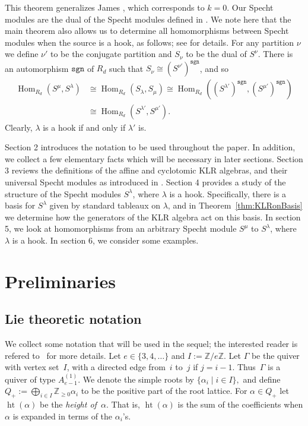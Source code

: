 \documentclass[twoside,11pt,reqno,letter]{amsart}
\numberwithin{equation}{section}
\theoremstyle{definition}  %
\newcommand{\Hom}{\operatorname{Hom}}
\def\sgn{\mathtt{sgn}}
\newcommand{\Z}{\mathbb{Z}}
\newcommand{\0}{{\bar 0}}
\newcommand{\1}{{\bar 1}}
\newcommand{\la}{\lambda}
\newcommand{\al}{\alpha}
\def\height{{\operatorname{ht}}}
\begin{document}
This theorem generalizes James \cite[Theorem 24.4]{J}, which corresponds to $k=0$. Our Specht modules are the dual of the Specht modules defined in \cite{J}. We note here that the main theorem also allows us to determine all homomorphisms between Specht modules when the source is a hook, as follows; see \cite{KMR} for details. For any partition $\nu$ we define $\nu'$ to be the conjugate partition and $S_\nu$ to be the dual of $S^\nu$. There is an automorphism $\sgn$ of $R_d$ such that $S_\nu \cong (S^{\nu'})^\sgn$, and so
\begin{align*}
\Hom_{R_d}(S^\mu,S^\la) &\cong \Hom_{R_d}(S_\la, S_\mu) \cong \Hom_{R_d}((S^{\la'})^\sgn, (S^{\mu'})^\sgn) \\
&\cong \Hom_{R_d}(S^{\la'}, S^{\mu'}).
\end{align*}
Clearly, $\la$ is a hook if and only if $\la'$ is.

Section 2 introduces the notation to be used throughout the paper. In addition, we collect a few elementary facts which will be necessary in later sections.
Section 3 reviews the definitions of the affine and cyclotomic KLR algebras, and their universal Specht modules as introduced in \cite{KMR}.
Section 4 provides a study of the structure of the Specht modules $S^\la$, where $\la$ is a hook. Specifically, there is a basis for $S^\la$ given by standard tableaux on $\la$, and in Theorem~\ref{thm:KLRonBasis} we determine how the generators of the KLR algebra act on this basis.
In section 5, we look at homomorphisms from an arbitrary Specht module $S^\mu$ to $S^\la$, where $\la$ is a hook.
In section 6, we consider some examples.











\section{Preliminaries}
\subsection{Lie theoretic notation}
We collect some notation that will be used in the sequel; the interested reader is refered to~\cite{KMR} for more details. Let $e \in \{3, 4, \dots\}$ and $I := \Z/e\Z.$ Let $\Gamma$ be the quiver with vertex set~$I$, with a directed edge from~$i$ to~$j$ if $j = i - 1$. Thus~$\Gamma$ is a quiver of type $A^{(1)}_{e-1}$. We denote the simple roots by $\{\al_i\mid i\in I\},$ and define $Q_+ := \bigoplus_{i \in I} \Z_{\geq 0} \alpha_i$ to be the positive part of the root lattice. For $\alpha \in Q_+$ let $\height(\alpha)$ be the {\em height of~$\al$}. That is, $\height(\al)$ is the sum of the coefficients when $\al$ is expanded in terms of the $\alpha_i$'s.
\end{document}
